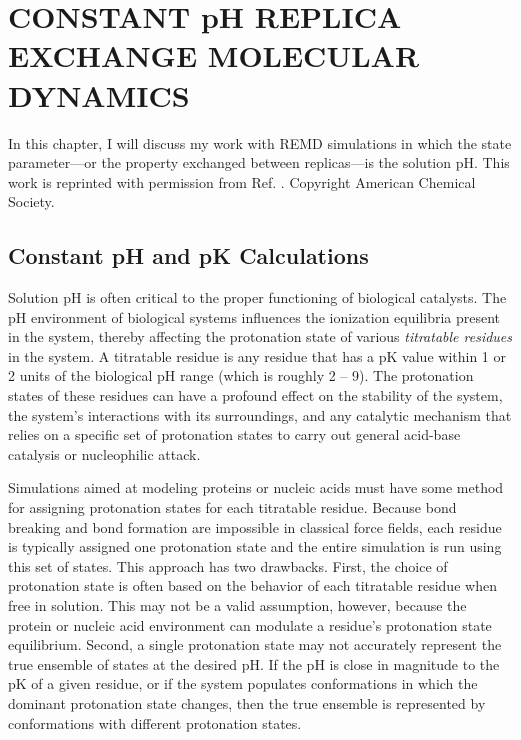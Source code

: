\chapter{CONSTANT pH REPLICA EXCHANGE MOLECULAR DYNAMICS}
\label{ch3}

In this chapter, I will discuss my work with REMD simulations in which the state
parameter---or the property exchanged between replicas---is the solution pH.
This work is reprinted with permission from Ref.
\cite{Swails_JChemTheoryComput_2012_v8_p4393}. Copyright
\citeyear{Swails_JChemTheoryComput_2012_v8_p4393} American Chemical Society.

\section{Constant pH and pK Calculations}

Solution pH is often critical to the proper functioning of biological catalysts.
\cite{Cornish-Bowden1969,White1959} The pH environment of biological systems
influences the ionization equilibria present in the system, thereby affecting
the protonation state of various \emph{titratable residues} in the system. A
titratable residue is any residue that has a pK value within 1 or 2 units
of the biological pH range (which is roughly 2 -- 9). The protonation states of
these residues can have a profound effect on the stability of the system, the
system's interactions with its surroundings, and any catalytic mechanism that
relies on a specific set of protonation states to carry out general acid-base
catalysis or nucleophilic attack. \cite{Tanford_JAmChemSoc_1957_v79_p5333}

Simulations aimed at modeling proteins or nucleic acids must have some method
for assigning protonation states for each titratable residue. Because bond
breaking and bond formation are impossible in classical force fields, each
residue is typically assigned one protonation state and the entire simulation is
run using this set of states. This approach has two drawbacks. First, the
choice of protonation state is often based on the behavior of each titratable
residue when free in solution. This may not be a valid assumption, however,
because the protein or nucleic acid environment can modulate a residue's
protonation state equilibrium. Second, a single protonation state may not
accurately represent the true ensemble of states at the desired pH. If the pH
is close in magnitude to the pK of a given residue, or if the system
populates conformations in which the dominant protonation state changes, then
the true ensemble is represented by conformations with different protonation
states.

